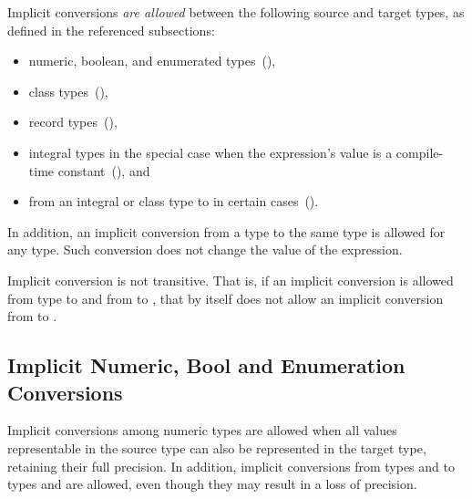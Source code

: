Implicit conversions \emph{are allowed} between
the following source and target types,
as defined in the referenced subsections:

\begin{itemize}
\item numeric, boolean, and enumerated types~(),
\item class types~(),
\item record types~(),
\item integral types in the special case when the expression's value
      is a compile-time constant~(), and
\item from an integral or class type to 
      in certain cases~().
\end{itemize}

In addition,
an implicit conversion from a type to the same type is allowed for any type.
Such conversion does not change the value of the expression.

Implicit conversion is not transitive. That is, if an implicit conversion
is allowed from type  to  and from  to ,
that by itself does not allow an implicit conversion
from  to .

\subsection{Implicit Numeric, Bool and Enumeration Conversions}
\label{Implicit_NumBoolEnum_Conversions}

Implicit conversions among numeric types are allowed when
all values representable in the source type can also be represented
in the target type, retaining their full precision.
%
%
In addition, implicit conversions from
types  and  to types 
and  are allowed, even though they may result in a loss of
precision.


